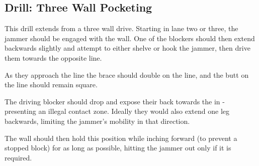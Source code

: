 \subsection*{Drill: Three Wall Pocketing}
\label{drill:three_wall/pocket}

This drill extends from a three wall drive.
Starting in lane two or three, the jammer should be engaged with the wall. 
One of the blockers should then extend backwards slightly and attempt to either shelve or hook the jammer, then drive them towards the opposite line. 

As they approach the line the brace should double on the line, and the butt on the line should remain square. 

The driving blocker should drop and expose their back towards the in - presenting an illegal contact zone.
Ideally they would also extend one leg backwards, limiting the jammer's mobility in that direction. 

The wall should then hold this position while inching forward (to prevent a stopped block) for as long as possible, hitting the jammer out only if it is required. 



